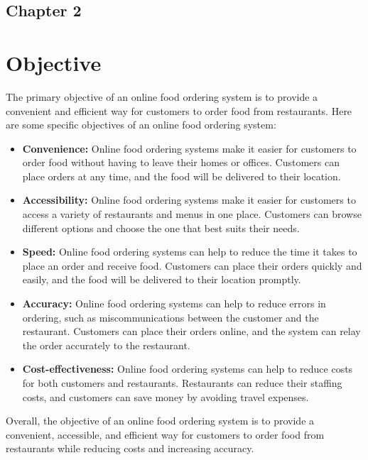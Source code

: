 \begin{center}
   \section*{\fontsize{20}{20}\selectfont Chapter 2}
   \end{center}
\vspace{10mm}
\section{Objective}

The primary objective of an online food ordering system is to provide a convenient and efficient way for customers to order food from restaurants. Here are some specific objectives of an online food ordering system:
\begin{itemize}
\item \textbf{ Convenience:} Online food ordering systems make it easier for customers to order food without having to leave their homes or offices. Customers can place orders at any time, and the food will be delivered to their location.

\item \textbf{Accessibility:} Online food ordering systems make it easier for customers to access a variety of restaurants and menus in one place. Customers can browse different options and choose the one that best suits their needs.

\item \textbf{Speed:} Online food ordering systems can help to reduce the time it takes to place an order and receive food. Customers can place their orders quickly and easily, and the food will be delivered to their location promptly.

\item \textbf{Accuracy: }Online food ordering systems can help to reduce errors in ordering, such as miscommunications between the customer and the restaurant. Customers can place their orders online, and the system can relay the order accurately to the restaurant.

\item \textbf{Cost-effectiveness:} Online food ordering systems can help to reduce costs for both customers and restaurants. Restaurants can reduce their staffing costs, and customers can save money by avoiding travel expenses.
\end{itemize}
Overall, the objective of an online food ordering system is to provide a convenient, accessible, and efficient way for customers to order food from restaurants while reducing costs and increasing accuracy.

